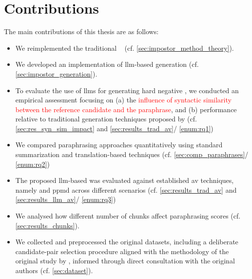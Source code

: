 


\section{Contributions}
\label{sec:contributions}
The main contributions of this thesis are as follows:
\begin{itemize}
    \item We reimplemented the traditional \impAppr{}~\citep{koppel_determining_2014} (cf. \autoref{sec:impostor_method_theory}).
    \item We developed an implementation of \ac{llm}-based \imp{} generation (cf. \autoref{sec:impostor_generation}). 
    \item To evaluate the use of \acp{llm} for generating hard negative \imps{}, we conducted an empirical assessment focusing on (a) the \textcolor{red}{influence of syntactic similarity between the reference candidate and the paraphrase}, and (b) performance relative to traditional \imp{} generation techniques proposed by \citet{koppel_determining_2014} (cf. \autoref{sec:res_syn_sim_impact} and \autoref{sec:results_trad_av}/ \ref{enum:rq1})
    \item We compared paraphrasing approaches quantitatively using standard summarization and translation-based techniques (cf. \autoref{sec:comp_paraphrases}/ \ref{enum:rq2})
    \item The proposed \ac{llm}-based \impAppr{} was evaluated against established \ac{av} techniques, namely \unmasking{} and \ac{ppmd} across different scenarios (cf. \autoref{sec:results_trad_av} and \autoref{sec:results_llm_av}/ \ref{enum:rq3})
    \item We analysed how different number of chunks affect paraphrasing scores (cf. \autoref{sec:results_chunks}).
    \item We collected and preprocessed the original datasets, including a deliberate candidate-pair selection procedure aligned with the methodology of the original study by \citet{koppel_determining_2014}, informed through direct consultation with the original authors (cf. \autoref{sec:dataset}).
\end{itemize}



